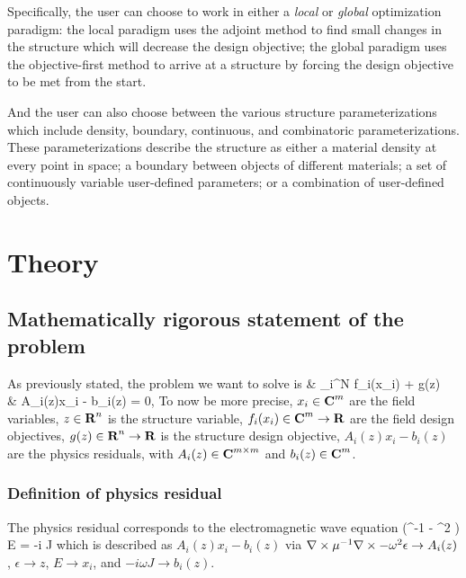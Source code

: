 \documentclass{book}
\newcommand{\reals}{{\mbox{\bf R}}}
\newcommand{\comps}{{\mbox{\bf C}}}
\begin{document}
Specifically, the user can choose to work in either
    a \emph{local} or \emph{global} optimization paradigm:
    \BI the local paradigm uses the adjoint method
            to find small changes in the structure which
            will decrease the design objective;
    \I  the global paradigm uses the objective-first method
            to arrive at a structure by forcing
            the design objective to be met from the start. \EI

And the user can also choose between the various structure parameterizations 
    which include density, boundary, 
    continuous, and combinatoric parameterizations.
These parameterizations describe the structure as either
    \BI a material density at every point in space;
    \I  a boundary between objects of different materials;
    \I  a set of continuously variable user-defined parameters; or 
    \I  a combination of user-defined objects. \EI

\chapter{Theory}
\section{Mathematically rigorous statement of the problem}
As previously stated, the problem we want to solve is 
        {\minimize&  \sum_i^N f_i(x_i) + g(z) \\
        \subto&     A_i(z)x_i - b_i(z) = 0,\quad{}}
To now be more precise,
    \BI $x_i \in \comps^m$ are the field variables,
    \I  $z \in \reals^n$ is the structure variable,
    \I  $f_i(x_i) \in \comps^m \to \reals$ are the field design objectives,
    \I  $g(z) \in \reals^n \to \reals$ is the structure design objective,
    \I  $A_i(z)x_i - b_i(z)$ are the physics residuals, with
    \I  $A_i(z) \in \comps^{m \times m}$ and
    \I  $b_i(z) \in \comps^m$. \EI

\subsection{Definition of physics residual}
The physics residual corresponds to the electromagnetic wave equation
        {(\curl \mu^{-1} \curl - \omega^2 \epsilon) E = -i \omega J}
    which is described as $A_i(z)x_i - b_i(z)$ via
    \BI $\nabla\times \mu^{-1} \nabla\times - \omega^2 \epsilon \to A_i(z)$,
    \I  $\epsilon \to z$,
    \I  $E \to x_i$, and
    \I  $-i \omega J \to b_i(z)$. \EI
\end{document}
